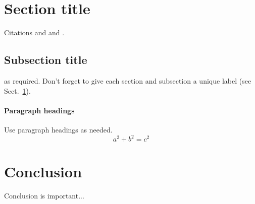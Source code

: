 
\clearpage

\section{Section title}
\label{sec:1}
Citations \cite{8338177} and \cite{8306880} and \cite{8338177}.
\subsection{Subsection title}
\label{sec:2}
as required. Don't forget to give each section
and subsection a unique label (see Sect.~\ref{sec:1}).
\paragraph{Paragraph headings} Use paragraph headings as needed.
\begin{equation}
a^2+b^2=c^2
\end{equation}

\section{Conclusion}
Conclusion is important...

